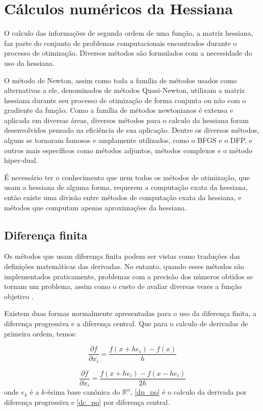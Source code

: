 \section{Cálculos numéricos da Hessiana}
O calculo das informações de segunda ordem de uma função, a matriz hessiana, faz parte do conjunto
de problemas computacionais encontrados durante o processo de otimização. Diversos métodos são
formulados com a necessidade do uso da hessiana.

O método de Newton, assim como toda a família de métodos usados como alternativas a ele,
denominados de métodos Quasi-Newton, utilizam a matriz hessiana durante seu processo de otimização
de forma conjunta ou não com o gradiente da função. Como a família de métodos newtonianos é extensa e
aplicada em diversas áreas, diversos métodos para o calculo da hessiana foram desenvolvidos
pensado na eficiência de sua aplicação. Dentre os diversos métodos, alguns se tornaram famosos
e amplamente utilizados, como o BFGS e o DFP, e outros mais específicos como métodos adjuntos,
métodos complexos e o método hiper-dual.

É necessário ter o conhecimento que nem todos os métodos de otimização, que usam a hessiana de
alguma forma, requerem a computação exata da hessiana, então existe uma divisão entre métodos
de computação exata da hessiana, e métodos que computam apenas aproximações da hessiana.


\subsection{Diferença finita}
Os métodos que usam diferença finita podem ser vistas como traduções das definições matemáticas
das derivadas. No entanto, quando esses métodos são implementados praticamente, problemas com a
precisão dos números obtidos se tornam um problema, assim como o custo de avaliar diversas
vezes a função objetivo \cite{caplan2011numerical}.

Existem duas formas normalmente apresentadas para o uso da diferença finita, a diferença
progressiva e a diferença central. Que para o calculo de derivadas de primeira ordem, temos:


\begin{equation}
\label{dp_po}
\frac{\partial f}{\partial x_i} = \frac{f(x+he_i) - f(x)}{h}
\end{equation}

\begin{equation}
\label{dc_po}
\frac{\partial f}{\partial x_i} = \frac{f(x+he_i) - f(x - he_i)}{2h}
\end{equation}
onde \(e_k\) é a \(k\)-ésima base canônica do \(\mathbb{R}^n\), \ref{dp_po} é o calculo
da derivada por diferença progressiva e \ref{dc_po} por diferença central.

